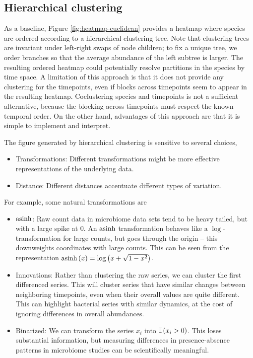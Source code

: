 \documentclass[14pt]{extarticle}
\begin{document}
\subsection{Hierarchical clustering}

As a baseline, Figure \ref{fig:heatmap-euclidean} provides a heatmap where
species are ordered according to a hierarchical clustering tree. Note that
clustering trees are invariant under left-right swaps of node children; to fix a
unique tree, we order branches so that the average abundance of the left subtree
is larger. The resulting ordered heatmap could potentially resolve partitions in
the species by time space. A limitation of this approach is that it does not
provide any clustering for the timepoints, even if blocks across timepoints seem
to appear in the resulting heatmap. Coclustering species and timepoints is not a
sufficient alternative, because the blocking across timepoints must respect the
known temporal order. On the other hand, advantages of this approach are that it
is simple to implement and interpret.

The figure generated by hierarchical clustering is sensitive to several choices,
\begin{itemize}
\item Transformations: Different transformations might be more effective
  representations of the underlying data.
\item Distance: Different distances accentuate different types of variation.
\end{itemize}

For example, some natural transformations are
\begin{itemize}
\item $\mathop\mathrm{asinh}$: Raw count data in microbiome data sets tend to
  be heavy tailed, but with a large spike at 0. An $\mathop\mathrm{asinh}$ transformation
  behaves like a $\log$-transformation for large counts, but goes through the
  origin -- this downweights coordinates with large counts. This can be seen
  from the representation $\mathop\mathrm{asinh}\left(x\right) = \log\left(x + \sqrt{1 -
      x^{2}}\right)$.
\item Innovations: Rather than clustering the raw series, we can cluster the
  first differenced series. This will cluster series that have similar changes between
  neighboring timepoints, even when their overall values are quite different. This
  can highlight bacterial series with similar dynamics, at the cost of ignoring
  differences in overall abundances.
\item Binarized: We can transform the series $x_{i}$ into $\mathbb{I}\left({x_{i} > 0}\right)$.
  This loses substantial information, but measuring differences in
  presence-absence patterns in microbiome studies can be scientifically
  meaningful.
\end{itemize}
\end{document}

